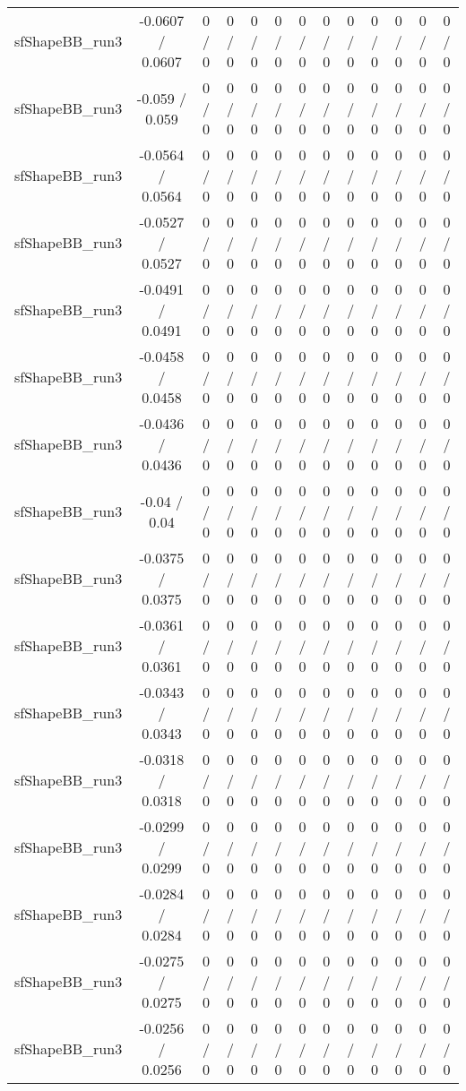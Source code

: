 \documentclass[10pt]{article}
\begin{document}
\begin{table}[htbp]
\begin{center}
\begin{tabular}{|c|c|c|c|c|c|c|c|c|c|c|c|c|}
  sfShapeBB_run3 & -0.0607 / 0.0607 & 0 / 0 & 0 / 0 & 0 / 0 & 0 / 0 & 0 / 0 & 0 / 0 & 0 / 0 & 0 / 0 & 0 / 0 & 0 / 0 & 0 / 0 \\ 
  sfShapeBB_run3 & -0.059 / 0.059 & 0 / 0 & 0 / 0 & 0 / 0 & 0 / 0 & 0 / 0 & 0 / 0 & 0 / 0 & 0 / 0 & 0 / 0 & 0 / 0 & 0 / 0 \\ 
  sfShapeBB_run3 & -0.0564 / 0.0564 & 0 / 0 & 0 / 0 & 0 / 0 & 0 / 0 & 0 / 0 & 0 / 0 & 0 / 0 & 0 / 0 & 0 / 0 & 0 / 0 & 0 / 0 \\ 
  sfShapeBB_run3 & -0.0527 / 0.0527 & 0 / 0 & 0 / 0 & 0 / 0 & 0 / 0 & 0 / 0 & 0 / 0 & 0 / 0 & 0 / 0 & 0 / 0 & 0 / 0 & 0 / 0 \\ 
  sfShapeBB_run3 & -0.0491 / 0.0491 & 0 / 0 & 0 / 0 & 0 / 0 & 0 / 0 & 0 / 0 & 0 / 0 & 0 / 0 & 0 / 0 & 0 / 0 & 0 / 0 & 0 / 0 \\ 
  sfShapeBB_run3 & -0.0458 / 0.0458 & 0 / 0 & 0 / 0 & 0 / 0 & 0 / 0 & 0 / 0 & 0 / 0 & 0 / 0 & 0 / 0 & 0 / 0 & 0 / 0 & 0 / 0 \\ 
  sfShapeBB_run3 & -0.0436 / 0.0436 & 0 / 0 & 0 / 0 & 0 / 0 & 0 / 0 & 0 / 0 & 0 / 0 & 0 / 0 & 0 / 0 & 0 / 0 & 0 / 0 & 0 / 0 \\ 
  sfShapeBB_run3 & -0.04 / 0.04 & 0 / 0 & 0 / 0 & 0 / 0 & 0 / 0 & 0 / 0 & 0 / 0 & 0 / 0 & 0 / 0 & 0 / 0 & 0 / 0 & 0 / 0 \\ 
  sfShapeBB_run3 & -0.0375 / 0.0375 & 0 / 0 & 0 / 0 & 0 / 0 & 0 / 0 & 0 / 0 & 0 / 0 & 0 / 0 & 0 / 0 & 0 / 0 & 0 / 0 & 0 / 0 \\ 
  sfShapeBB_run3 & -0.0361 / 0.0361 & 0 / 0 & 0 / 0 & 0 / 0 & 0 / 0 & 0 / 0 & 0 / 0 & 0 / 0 & 0 / 0 & 0 / 0 & 0 / 0 & 0 / 0 \\ 
  sfShapeBB_run3 & -0.0343 / 0.0343 & 0 / 0 & 0 / 0 & 0 / 0 & 0 / 0 & 0 / 0 & 0 / 0 & 0 / 0 & 0 / 0 & 0 / 0 & 0 / 0 & 0 / 0 \\ 
  sfShapeBB_run3 & -0.0318 / 0.0318 & 0 / 0 & 0 / 0 & 0 / 0 & 0 / 0 & 0 / 0 & 0 / 0 & 0 / 0 & 0 / 0 & 0 / 0 & 0 / 0 & 0 / 0 \\ 
  sfShapeBB_run3 & -0.0299 / 0.0299 & 0 / 0 & 0 / 0 & 0 / 0 & 0 / 0 & 0 / 0 & 0 / 0 & 0 / 0 & 0 / 0 & 0 / 0 & 0 / 0 & 0 / 0 \\ 
  sfShapeBB_run3 & -0.0284 / 0.0284 & 0 / 0 & 0 / 0 & 0 / 0 & 0 / 0 & 0 / 0 & 0 / 0 & 0 / 0 & 0 / 0 & 0 / 0 & 0 / 0 & 0 / 0 \\ 
  sfShapeBB_run3 & -0.0275 / 0.0275 & 0 / 0 & 0 / 0 & 0 / 0 & 0 / 0 & 0 / 0 & 0 / 0 & 0 / 0 & 0 / 0 & 0 / 0 & 0 / 0 & 0 / 0 \\ 
  sfShapeBB_run3 & -0.0256 / 0.0256 & 0 / 0 & 0 / 0 & 0 / 0 & 0 / 0 & 0 / 0 & 0 / 0 & 0 / 0 & 0 / 0 & 0 / 0 & 0 / 0 & 0 / 0 \\ 

\end{tabular}
\end{center}
\end{table}
\end{document}
